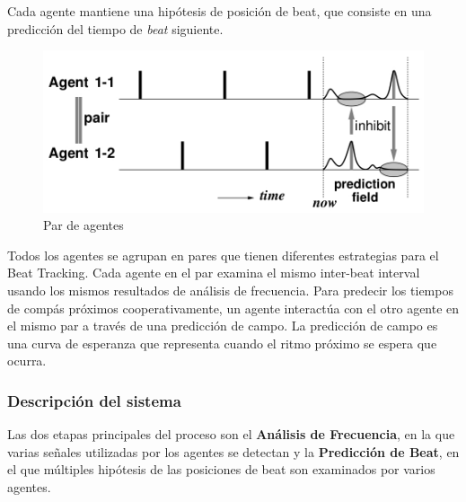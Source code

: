 \documentclass[12pt,a4paper,titlepage]{report}
\begin{document}
Cada agente mantiene una hipótesis de posición de beat, que consiste en una predicción del tiempo de \emph{beat} siguiente.\\

\begin{figure}
	\vspace{-20pt}
	\begin{center}
	\includegraphics[width=.4\textwidth]{./pics/agent_pair.jpg}
	\end{center}
	\vspace{-10pt}
	\caption{Par de agentes}
	\label{fig:agent_pair}
	\vspace{-10pt}
\end{figure}

Todos los agentes se agrupan en pares que tienen diferentes estrategias para el Beat Tracking. Cada agente en el par examina el mismo inter-beat interval usando los mismos resultados de análisis de frecuencia. Para predecir los tiempos de compás próximos cooperativamente, un agente interactúa con el otro agente en el mismo par a través de una predicción de campo. La predicción de campo es una curva de esperanza que representa cuando el ritmo próximo se espera que ocurra.

\subsubsection*{Descripción del sistema}
Las dos etapas principales del proceso son el \textbf{Análisis de Frecuencia}, en la que varias señales utilizadas por los agentes se detectan y la \textbf{Predicción de Beat}, en el que múltiples hipótesis de las posiciones de beat son examinados por varios agentes.\\
\end{document}
